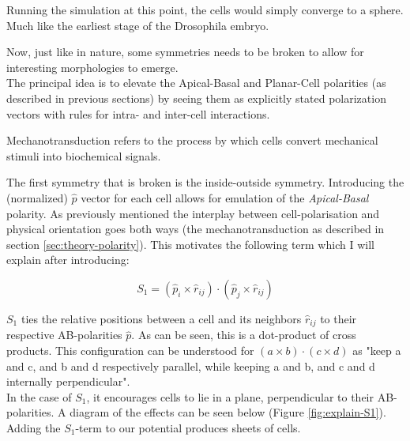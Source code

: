 Running the simulation at this point, the cells would simply converge to a sphere. Much like the earliest stage of the Drosophila embryo.






Now, just like in nature, some symmetries needs to be broken to allow for interesting morphologies to emerge.\\
The principal idea is to elevate the Apical-Basal and Planar-Cell polarities (as described in previous sections) by seeing them as explicitly stated polarization vectors with rules for intra- and inter-cell interactions. 

Mechanotransduction refers to the process by which cells convert mechanical stimuli into biochemical signals.

The first symmetry that is broken is the inside-outside symmetry. Introducing the (normalized) $\hat{p}$ vector for each cell allows for emulation of the \textit{Apical-Basal} polarity.
As previously mentioned the interplay between cell-polarisation and physical orientation goes both ways (the mechanotransduction as described in section \ref{sec:theory-polarity}).
This motivates the following term which I will explain after introducing:

\begin{equation*}
    S_1=\left(\hat{p}_i \times \hat{r}_{i j}\right) \cdot\left(\hat{p}_j \times \hat{r}_{i j}\right)
\end{equation*}

$S_1$ ties the relative positions between a cell and its neighbors $\hat{r}_{i j}$ to their respective AB-polarities $\hat{p}$.
As can be seen, this is a dot-product of cross products. This configuration can be understood for $\left(a \times b\right) \cdot\left(c \times d\right)$ as "keep a and c, and b and d respectively parallel, while keeping a and b, and c and d internally perpendicular". \\ 

In the case of $S_1$, it encourages cells to lie in a plane, perpendicular to their AB-polarities. A diagram of the effects can be seen below (Figure \ref{fig:explain-S1}). Adding the $S_1$-term to our potential produces sheets of cells. 

